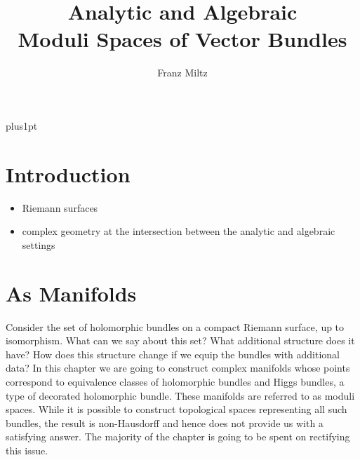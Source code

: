 \documentclass[12pt]{ociamthesis}  %
\title{Analytic and Algebraic\\[1ex]Moduli Spaces of Vector Bundles}   %
\author{Franz Miltz}             %
\begin{document}
\baselineskip=18pt plus1pt

\setcounter{secnumdepth}{3}
\setcounter{tocdepth}{3}


\maketitle                  %
\begin{dedication}
\end{dedication}

\begin{acknowledgements}
\end{acknowledgements}

\begin{abstract}
\end{abstract}

\begin{romanpages}          %
  \tableofcontents            %
\end{romanpages}            %

\chapter{Introduction}

\begin{itemize}
  \item Riemann surfaces
  \item complex geometry at the intersection between the analytic and algebraic settings
\end{itemize}


\chapter{As Manifolds}

Consider the set of holomorphic bundles on a compact Riemann surface,
up to isomorphism. What can we say about this set? What additional
structure does it have? How does this structure change if we equip
the bundles with additional data?
In this chapter we are going to construct complex manifolds whose
points correspond to equivalence classes of holomorphic bundles
and Higgs bundles, a type of decorated holomorphic bundle. These
manifolds are referred to as moduli spaces. While it
is possible to construct topological spaces representing all such bundles,
the result is non-Hausdorff and hence does not provide us with a
satisfying answer. The majority of the chapter is going to be spent
on rectifying this issue.
\end{document}
